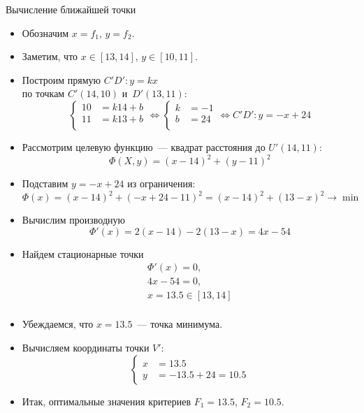\documentclass[unicode,11pt,notheorems,xcolor=table]{beamer}
\begin{document}
\begin{frame}[allowframebreaks]{Вычисление ближайшей точки}{}
    
    \begin{itemize}
        \item Обозначим $x=f_1$, $y=f_2$.
        \item Заметим, что $x \in [13,14]$, $y \in [10,11]$.
        \item Построим прямую  $C'D'\colon y=kx$\\ по точкам $C'(14,10)$ и~$D'(13,11)$: 
        $$
        \left\lbrace 
        \begin{aligned}
            10 &= k14+b\\
            11 &= k13+b\\
        \end{aligned}
        \right.
        \Longleftrightarrow
        \left\lbrace 
        \begin{aligned}
            k &= -1\\
            b &= 24\\
        \end{aligned}
        \right.
        \Longleftrightarrow
        C'D'\colon y=-x+24
        $$
    \item Рассмотрим целевую функцию~--- квадрат расстояния до $U'(14,11)$:
        $$
            \Phi(X,y) = (x-14)^2+(y-11)^2 
        $$
    \item Подставим $y=-x+24$ из ограничения:
        $$
            \Phi(x) = (x-14)^2+(-x+24-11)^2  = (x-14)^2 + (13-x)^2 \to \min
        $$
    \framebreak
    \item Вычислим производную
        $$
            \Phi'(x) = 2(x-14) - 2(13-x) = 4x-54
        $$
    \item Найдем  стационарные точки
        $$
            \begin{gathered}
                \Phi'(x) = 0,\\
                4x-54    =0,\\
                x    = 13.5 \in [13,14]\\
            \end{gathered}
        $$
    \item Убеждаемся, что $x=13.5$~--- точка минимума.
    \item Вычисляем координаты  точки $V'$:
    $$
    \left \lbrace\begin{aligned}
        x &= 13.5\\
        y &= -13.5+24 = 10.5
    \end{aligned}
    \right.
    $$
    \framebreak
    \item Итак, оптимальные значения критериев $F_1=13.5$, $F_2=10.5$.
    \end{itemize}
\end{frame}
\end{document}
